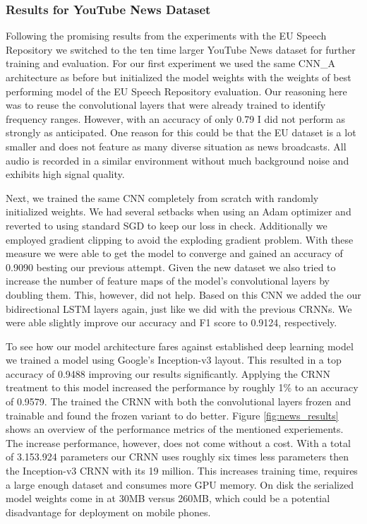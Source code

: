 \subsubsection{Results for YouTube News Dataset}
\label{sec:results_news}
Following the promising results from the experiments with the EU Speech Repository we switched to the ten time larger YouTube News dataset for further training and evaluation.
For our first experiment we used the same CNN\_A architecture as before but initialized the model weights with the weights of best performing model of the EU Speech Repository evaluation. Our reasoning here was to reuse the convolutional layers that were already trained to identify frequency ranges. However, with an accuracy of only 0.79 I did not perform as strongly as anticipated. One reason for this could be that the EU dataset is a lot smaller and does not feature as many diverse situation as news broadcasts. All audio is recorded in a similar environment without much background noise and exhibits high signal quality.

Next, we trained the same CNN completely from scratch with randomly initialized weights. We had several setbacks when using an Adam optimizer and reverted to using standard SGD to keep our loss in check. Additionally we employed gradient clipping to avoid the exploding gradient problem. With these measure we were able to get the model to converge and gained an accuracy of 0.9090 besting our previous attempt. 
Given the new dataset we also tried to increase the number of feature maps of the model's convolutional layers by doubling them. This, however, did not help.
Based on this CNN we added the our bidirectional LSTM layers again, just like we did with the previous CRNNs. We were able slightly improve our accuracy and F1 score to 0.9124, respectively. 

To see how our model architecture fares against established deep learning model we trained a model using Google's Inception-v3\cite{szegedy2016rethinking} layout. This resulted in a top accuracy of 0.9488 improving our results significantly. Applying the CRNN treatment to this model increased the performance by roughly 1\% to an accuracy of 0.9579. The trained the CRNN with both the convolutional layers frozen and trainable and found the frozen variant to do better. Figure \ref{fig:news_results} shows an overview of the performance metrics of the mentioned experiements.
The increase performance, however, does not come without a cost. With a total of 3.153.924 parameters our CRNN uses roughly six times less parameters then the Inception-v3 CRNN with its 19 million. This increases training time, requires a large enough dataset and consumes more GPU memory. On disk the serialized model weights come in at 30MB versus 260MB, which could be a potential disadvantage for deployment on mobile phones.

